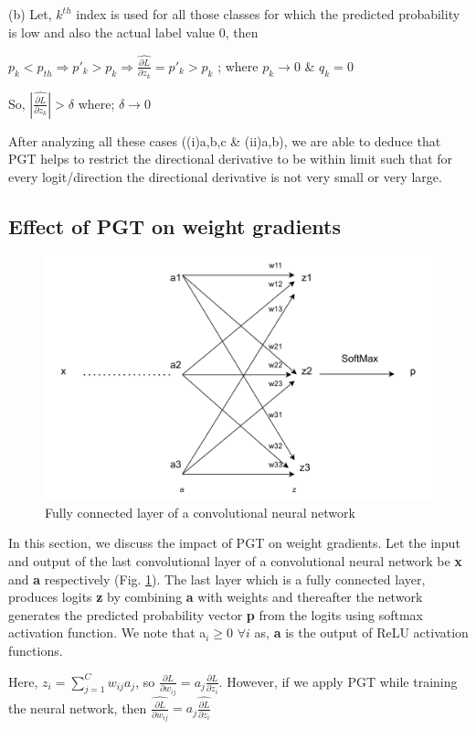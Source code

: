 \documentclass[runningheads]{llncs}
\begin{document}
(b) Let, $k^{th}$ index is used for all those classes for which the predicted
probability is low and also the actual label value $0$, then

$p_k < p_{th} \Rightarrow p'_k > p_k \Rightarrow \widehat{\frac{\partial L}{\partial
z_k}} = p'_k >  p_k$ ; where $p_k\rightarrow 0$ \& $q_k = 0$

So, $|\widehat{\frac{\partial L}{\partial z_k}}| >\delta$ where; $\delta\rightarrow 0$

After analyzing all these cases ((i)a,b,c \& (ii)a,b), we are able to deduce that PGT
helps to restrict the directional derivative to be within limit such that for every
logit/direction the directional derivative is not very small or very large. 

\subsection{Effect of PGT on weight gradients}
\label{sec:pgt_weight_gradients}

\begin{figure}[t]
\centering
\includegraphics[scale=1.0,width=0.5\columnwidth]{simplenn.jpg}
\caption{Fully connected layer of a convolutional neural network} 
\label{fig:simplenn}
\end{figure} 




In this section, we discuss the impact of PGT on weight gradients. Let the input and
output of the last convolutional layer of a convolutional neural network be \textbf{x}
and \textbf{a} respectively (Fig. \ref{fig:simplenn}). The last layer which is a fully
connected layer, produces logits \textbf{z} by combining \textbf{a} with weights and
thereafter the network generates the predicted probability vector \textbf{p} from the
logits using softmax activation function. We note that a$_i \geq 0$ $ \forall i$  as,
\textbf{a} is the output of ReLU activation functions.


Here, $z_i = \sum_{j=1}^{C}w_{ij}a_j$, so $\frac{\partial L}{\partial w_{ij}} =
a_j\frac{\partial L}{\partial z_{i}} $. However, if we apply PGT while training the
neural network, then $\widehat{\frac{\partial L}{\partial w_{ij}}}
=a_j\widehat{\frac{\partial L}{\partial z_i}}$
\end{document}
